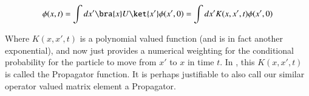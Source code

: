 \begin{align*}
\phi(x,t) = \int dx' \bra{x} U \ket{x'} \phi(x',0) = \int dx' K(x,x',t) \phi(x',0) 
\end{align*}

Where $K(x,x',t)$ is a polynomial valued function (and is in fact another exponential), and now just provides a numerical weighting for the conditional probability for the particle to move from $x'$ to $x$ in time $t$.  In \cite{liboff2003iqm}, this $K(x,x',t)$ is called the Propagator function.  It is perhaps justifiable to also call our similar operator valued matrix element a Propagator.

%
%


\EndArticle
